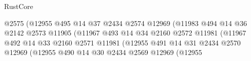 \begin{lexlean}{RustCore}
\begin{coremodule}
                                                @2575
                                                (@12955
                                                  @495
                                                  @14
                                                  @37
                                                  @2434
                                                  @2574
                                                  @12969
                                                  (@11983
                                                    @494
                                                    @14
                                                    @36
                                                    @2142
                                                    @2573
                                                    @11905
                                                    (@11967
                                                      @493
                                                      @14
                                                      @34
                                                      @2160
                                                      @2572
                                                      @11981
                                                      (@11967
                                                        @492
                                                        @14
                                                        @33
                                                        @2160
                                                        @2571
                                                        @11981
                                                        (@12955
                                                          @491
                                                          @14
                                                          @31
                                                          @2434
                                                          @2570
                                                          @12969
                                                          (@12955
                                                            @490
                                                            @14
                                                            @30
                                                            @2434
                                                            @2569
                                                            @12969
                                                            (@12955

\end{coremodule}
\end{lexlean}
